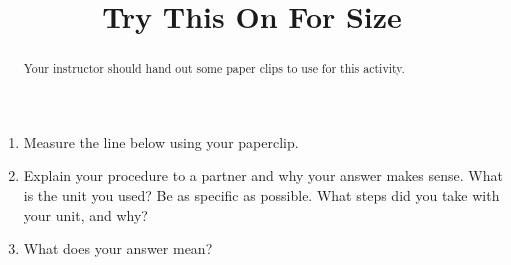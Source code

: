 \documentclass[nooutcomes,noauthor]{ximera}
\title{Try This On For Size}
\begin{document}
\begin{abstract}
Your instructor should hand out some paper clips to use for this activity.
\end{abstract}
\maketitle

\begin{problem}
\begin{enumerate}
\item Measure the line below using your paperclip. 
\item Explain your procedure to a partner and why your answer makes sense. What is the unit you used? Be as specific as possible. What steps did you take with your unit, and why?
\item What does your answer mean?
\end{enumerate}
\begin{center}
\end{center}
\end{problem}

\vfill
\end{document}

